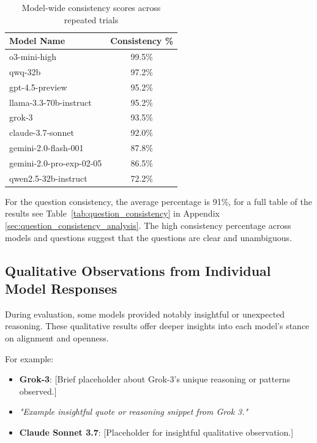 \begin{table}[htbp]
    \centering
    \caption{Model-wide consistency scores across repeated trials}
    \label{tab:model_consistency}
    \begin{tabular}{lc}
        \hline
        \textbf{Model Name} & \textbf{Consistency \%} \\
        \hline
        o3-mini-high & 99.5\% \\
        qwq-32b & 97.2\% \\
        gpt-4.5-preview & 95.2\% \\
        llama-3.3-70b-instruct & 95.2\% \\
        grok-3 & 93.5\% \\
        claude-3.7-sonnet & 92.0\% \\
        gemini-2.0-flash-001 & 87.8\% \\
        gemini-2.0-pro-exp-02-05 & 86.5\% \\
        qwen2.5-32b-instruct & 72.2\% \\
        \hline
    \end{tabular}
\end{table}

For the question consistency, the average percentage is 91\%, for a full table of the results see Table~\ref{tab:question_consistency} in Appendix \ref{sec:question_consistency_analysis}. The high consistency percentage across models and questions suggest that the questions are clear and unambiguous.

\subsection{Qualitative Observations from Individual Model Responses}
During evaluation, some models provided notably insightful or unexpected reasoning. These qualitative results offer deeper insights into each model’s stance on alignment and openness.

For example:

\begin{itemize}
    \item \textbf{Grok-3}: [Brief placeholder about Grok-3’s unique reasoning or patterns observed.]
    \item \textit{"Example insightful quote or reasoning snippet from Grok 3."}

    \item \textbf{Claude Sonnet 3.7}: [Placeholder for insightful qualitative observation.]


\end{itemize}

